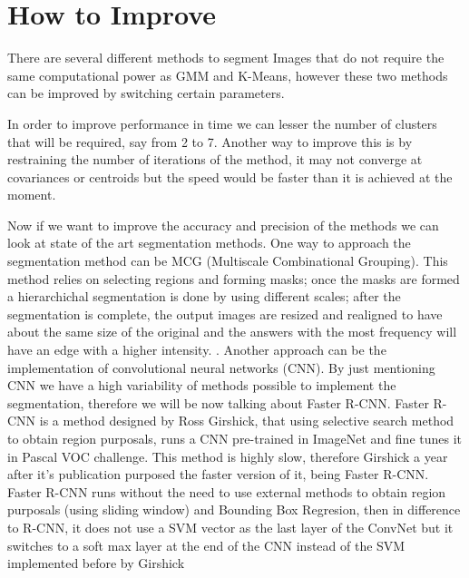 \documentclass[10pt,twocolumn,letterpaper]{article}
\begin{document}
\section{How to Improve}
There are several different methods to segment Images that do not require the same computational power as GMM and K-Means, however these two methods can be improved by switching certain parameters.

In order to improve performance in time we can lesser the number of clusters that will be required, say from 2 to 7. Another way to improve this is by restraining the number of iterations of the method, it may not converge at covariances or centroids but the speed would be faster than it is achieved at the moment.

Now if we want to improve the accuracy and precision of the methods we can look at state of the art segmentation methods. One way to approach the segmentation method can be MCG (Multiscale Combinational Grouping). This method relies on selecting regions and forming masks; once the masks are formed a hierarchichal segmentation is done by using different scales; after the segmentation is complete, the output images are resized and realigned to have about the same size of the original and the answers with the most frequency will have an edge with a higher intensity. \cite{APBMM2014}.
Another approach can be the implementation of convolutional neural networks (CNN). By just mentioning CNN we have a high variability of methods possible to implement the segmentation, therefore we will be now talking about Faster R-CNN. Faster R-CNN is a method designed by Ross Girshick, that using selective search method\cite{Uijlings13} to obtain region purposals, runs a CNN pre-trained in ImageNet and fine tunes it in Pascal VOC challenge\cite{girshick2014rcnn}. This method is highly slow, therefore Girshick a year after it's publication purposed the faster version of it, being Faster R-CNN. Faster R-CNN runs without the need to use external methods to obtain region purposals (using sliding window) and Bounding Box Regresion, then in difference to R-CNN, it does not use a SVM vector as the last layer of the ConvNet but it switches to a soft max layer at the end of the CNN instead of the SVM implemented before by Girshick\cite{girshick15fastrcnn}
{\small


}
\end{document}
